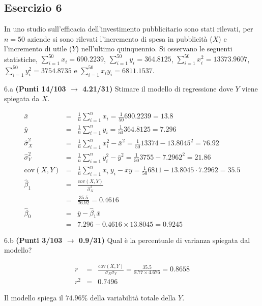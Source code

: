 \documentclass[
  11pt,
]{book}
\theoremstyle{mytheoremstyle}
\theoremstyle{mydefstyle}
\newenvironment{sol}
  {
  \begin{tcolorbox}[enhanced,breakable,arc=0.1mm,boxrule=1pt,colback=white,colframe=iblue,
  title=\bf \fontfamily{lmss}\selectfont \hspace{.5 cm} Soluzione,drop fuzzy shadow]

}{
\end{tcolorbox}
  }
\begin{document}
\subsection{Esercizio 6}\label{esercizio-6-24}

In uno studio sull'efficacia dell'investimento pubblicitario sono stati rilevati, per \(n=50\) aziende si sono rilevati l'incremento di spesa in
pubblicità (\(X\)) e l'incremento di utile (\(Y\)) nell'ultimo quinquennio. Si osservano le seguenti statistiche, \(\sum_{i=1}^{50}x_i=690.2239\), \(\sum_{i=1}^{50}y_i=364.8125\),
\(\sum_{i=1}^{50}x_i^2=13373.9607\), \(\sum_{i=1}^{50}y_i^2=3754.8735\) e \(\sum_{i=1}^{50}x_iy_i=6811.1537\).

6.a \textbf{(Punti 14/103 \(\rightarrow\) 4.21/31)} Stimare il modello di regressione dove \(Y\) viene spiegata da \(X\).

\begin{sol}
\begin{eqnarray*}
           \bar x &=&\frac 1 n\sum_{i=1}^n x_i = \frac {1}{ 50 }  690.2239 =  13.8 \\
           \bar y &=&\frac 1 n\sum_{i=1}^n y_i = \frac {1}{ 50 }  364.8125 =  7.296 \\
           \hat\sigma_X^2&=&\frac 1 n\sum_{i=1}^n x_i^2-\bar x^2=\frac {1}{ 50 }  13374  - 13.8045 ^2= 76.92 \\
           \hat\sigma_Y^2&=&\frac 1 n\sum_{i=1}^n y_i^2-\bar y^2=\frac {1}{ 50 }  3755  - 7.2962 ^2= 21.86 \\
           \text{cov}(X,Y)&=&\frac 1 n\sum_{i=1}^n x_i~y_i-\bar x\bar y=\frac {1}{ 50 }  6811 - 13.8045 \cdot 7.2962 = 35.5 \\
           \hat\beta_1 &=& \frac{\text{cov}(X,Y)}{\hat\sigma_X^2} \\
                    &=& \frac{ 35.5 }{ 76.92 }  =  0.4616 \\
           \hat\beta_0 &=& \bar y - \hat\beta_1 \bar x\\
                    &=&  7.296 - 0.4616 \times  13.8045 = 0.9245 
         \end{eqnarray*}

\end{sol}

6.b \textbf{(Punti 3/103 \(\rightarrow\) 0.9/31)} Qual è la percentuale di varianza spiegata dal modello?

\begin{sol}
\begin{eqnarray*}
r&=&\frac{\text{cov}(X,Y)}{\sigma_X\sigma_Y}=\frac{ 35.5 }{ 8.77 \times 4.676 }= 0.8658 \\ 
r^2&=& 0.7496\end{eqnarray*}

Il modello spiega il \(74.96\%\) della variabilità totale della \(Y\).

\end{sol}
\end{document}
